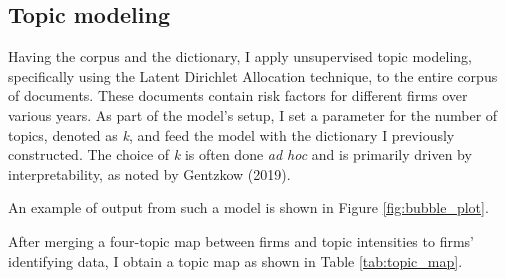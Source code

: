 \documentclass[12pt, letterpaper]{article}
\begin{document}



\subsection{Topic modeling}

Having the corpus and the dictionary, I apply unsupervised topic modeling, specifically using the Latent Dirichlet Allocation technique, to the entire corpus of documents. These documents contain risk factors for different firms over various years. As part of the model's setup, I set a parameter for the number of topics, denoted as \textit{k}, and feed the model with the dictionary I previously constructed. The choice of \textit{k} is often done \textit{ad hoc} and is primarily driven by interpretability, as noted by Gentzkow (2019).

An example of output from such a model is shown in Figure \ref{fig:bubble_plot}.


After merging a four-topic map between firms and topic intensities to firms' identifying data, I obtain a topic map as shown in Table \ref{tab:topic_map}.




\end{document}
